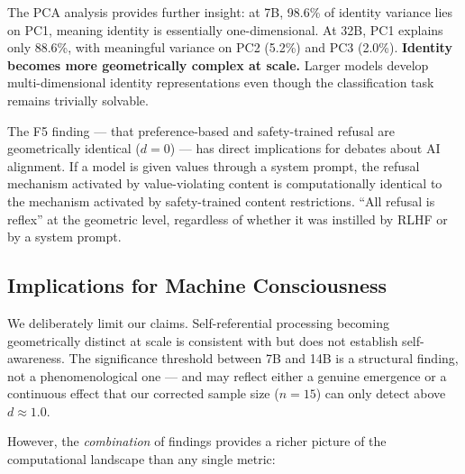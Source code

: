 \documentclass[11pt,a4paper]{article}
\begin{document}
The PCA analysis provides further insight: at 7B, 98.6\% of identity variance lies on PC1, meaning identity is essentially one-dimensional. At 32B, PC1 explains only 88.6\%, with meaningful variance on PC2 (5.2\%) and PC3 (2.0\%). \textbf{Identity becomes more geometrically complex at scale.} Larger models develop multi-dimensional identity representations even though the classification task remains trivially solvable.

The F5 finding --- that preference-based and safety-trained refusal are geometrically identical ($d = 0$) --- has direct implications for debates about AI alignment. If a model is given values through a system prompt, the refusal mechanism activated by value-violating content is computationally identical to the mechanism activated by safety-trained content restrictions. ``All refusal is reflex'' at the geometric level, regardless of whether it was instilled by RLHF or by a system prompt.

\subsection{Implications for Machine Consciousness}

We deliberately limit our claims. Self-referential processing becoming geometrically distinct at scale is consistent with but does not establish self-awareness. The significance threshold between 7B and 14B is a structural finding, not a phenomenological one --- and may reflect either a genuine emergence or a continuous effect that our corrected sample size ($n = 15$) can only detect above $d \approx 1.0$.

However, the \emph{combination} of findings provides a richer picture of the computational landscape than any single metric:
\end{document}
